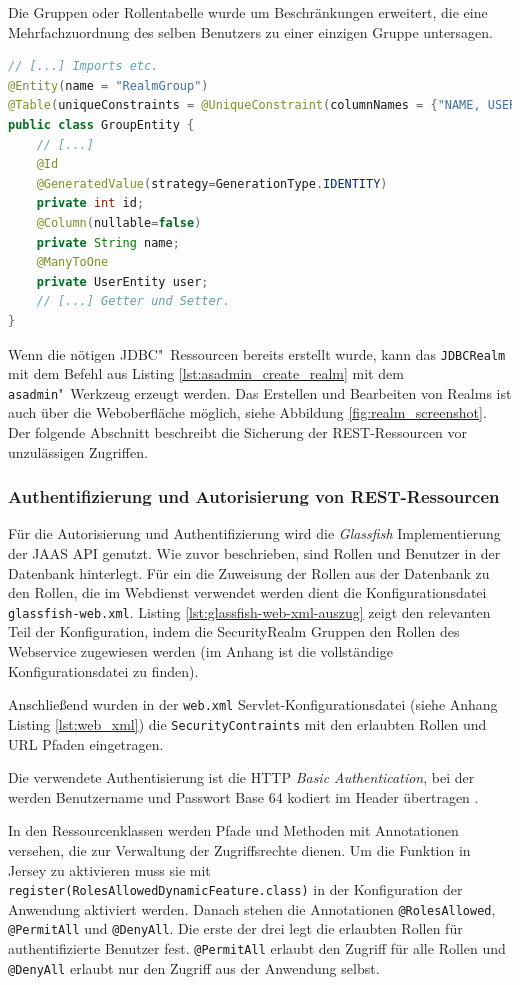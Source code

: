 Die Gruppen oder Rollentabelle wurde um Beschränkungen erweitert, die eine Mehrfachzuordnung des selben Benutzers zu einer einzigen Gruppe untersagen.
\begin{lstlisting}[language=Java,caption={Auszug aus der GroupEntity Klasse.}, label=lst:jdbcrealm_klasse_gruppe_code]
// [...] Imports etc.
@Entity(name = "RealmGroup")
@Table(uniqueConstraints = @UniqueConstraint(columnNames = {"NAME, USER_ID"}))
public class GroupEntity {
    // [...]
    @Id
    @GeneratedValue(strategy=GenerationType.IDENTITY)
    private int id;
    @Column(nullable=false)
    private String name;
    @ManyToOne
    private UserEntity user;
    // [...] Getter und Setter.
}
\end{lstlisting}

Wenn die nötigen \ac{JDBC}"~Ressourcen bereits erstellt wurde, kann das \texttt{JDBCRealm} mit dem Befehl aus Listing \ref{lst:asadmin_create_realm} mit dem \texttt{asadmin}"~Werkzeug erzeugt werden.
Das Erstellen und Bearbeiten von Realms ist auch über die Weboberfläche möglich, siehe Abbildung \ref{fig:realm_screenshot}.
Der folgende Abschnitt beschreibt die Sicherung der \ac{REST}-Ressourcen vor unzulässigen Zugriffen.

\subsubsection{Authentifizierung und Autorisierung von REST-Ressourcen}
Für die Autorisierung und Authentifizierung wird die \emph{Glassfish} Implementierung der \ac{JAAS} API genutzt.
Wie zuvor beschrieben, sind Rollen und Benutzer in der Datenbank hinterlegt.
Für ein die Zuweisung der Rollen aus der Datenbank zu den Rollen, die im Webdienst verwendet werden dient die Konfigurationsdatei \texttt{glassfish-web.xml}.
Listing \ref{lst:glassfish-web-xml-auszug} zeigt den relevanten Teil der Konfiguration, indem die SecurityRealm Gruppen den Rollen des Webservice zugewiesen werden (im Anhang ist die vollständige Konfigurationsdatei zu finden).

Anschließend wurden in der \texttt{web.xml} Servlet-Konfigurationsdatei (siehe Anhang Listing \ref{lst:web_xml}) die \texttt{SecurityContraints} mit den erlaubten Rollen und \ac{URL} Pfaden eingetragen.

Die verwendete Authentisierung ist die \ac{HTTP} \emph{Basic Authentication}, bei der werden Benutzername und Passwort Base 64 kodiert im Header übertragen \cite[vgl.][216\psq]{Burke.2014}.

In den Ressourcenklassen werden Pfade und Methoden mit Annotationen versehen, die zur Verwaltung der Zugriffsrechte dienen.
Um die Funktion in Jersey zu aktivieren muss sie mit \texttt{register(RolesAllowedDynamicFeature.class)} in der Konfiguration der Anwendung aktiviert werden.
Danach stehen die Annotationen \texttt{@RolesAllowed}, \texttt{@PermitAll} und \texttt{@DenyAll}.
Die erste der drei legt die erlaubten Rollen für authentifizierte Benutzer fest. \texttt{@PermitAll} erlaubt den Zugriff für alle Rollen und \texttt{@DenyAll} erlaubt nur den Zugriff aus der Anwendung selbst. \cite[Vgl.][219\psqq]{Burke.2014}


